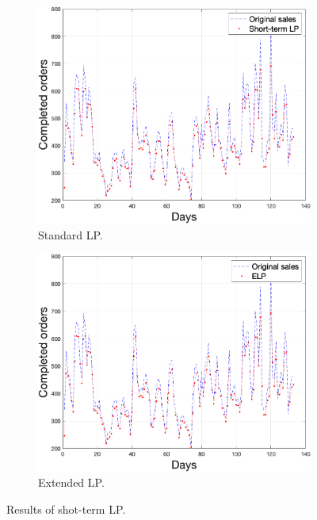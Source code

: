     \begin{figure}
        \centering
        \begin{subfigure}[b]{0.6\textwidth}
            \includegraphics[width=\textwidth]{figures/expLP.png}
            \caption{Standard LP.}
            \label{fig:slpres}
        \end{subfigure}
        \begin{subfigure}[b]{0.6\textwidth}
            \includegraphics[width=\textwidth]{figures/expELP.png}
            \caption{Extended LP.}
            \label{fig:slpmse}
        \end{subfigure}
        \caption{Results of shot-term LP.}
        \label{fig:shortresult}
    \end{figure}
    
